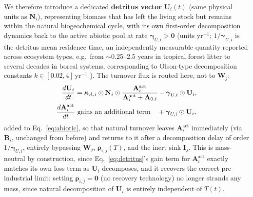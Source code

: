 \documentclass[twocolumn,10pt]{article}
\begin{document}
We therefore introduce a dedicated \textbf{detritus vector} $\mathbf U_i(t)$ (same physical units as $\mathbf N_i$), representing biomass that has left the living stock but remains within the natural biogeochemical cycle, with its own first-order decomposition dynamics back to the active abiotic pool at rate $\boldsymbol\gamma_{U,i}>\mathbf 0$ (units yr$^{-1}$; $1/\boldsymbol\gamma_{U,i}$ is the detritus mean residence time, an independently measurable quantity reported across ecosystem types, e.g.\ from $\sim$0.25--2.5 years in tropical forest litter to several decades in boreal systems, corresponding to Olson-type decomposition constants $k\in[0.02,4]\,\text{yr}^{-1}$ \cite{olson1963}). The turnover flux is routed here, not to $\mathbf W_j$:
\begin{align}
\frac{d\mathbf U_i}{dt} &= \boldsymbol\kappa_{A,i}\odot\mathbf N_i\odot\frac{\mathbf A^{\text{act}}_i}{\mathbf A^{\text{act}}_i+\mathbf A_{0,i}} - \boldsymbol\gamma_{U,i}\odot\mathbf U_i, \label{eq:detritus}\\
\frac{d\mathbf A^{\text{act}}_i}{dt}&\ \text{gains an additional term}\quad+\boldsymbol\gamma_{U,i}\odot\mathbf U_i,\notag
\end{align}
added to Eq.~\eqref{eq:abiotic}, so that natural turnover leaves $\mathbf A^{\text{act}}_i$ immediately (via $\mathbf B_i$, unchanged from before) and returns to it after a decomposition delay of order $1/\boldsymbol\gamma_{U,i}$, entirely bypassing $\mathbf W_j$, $\boldsymbol\rho_{i,j}(T)$, and the inert sink $\mathbf I_j$. This is mass-neutral by construction, since Eq.~\eqref{eq:detritus}'s gain term for $\mathbf A^{\text{act}}_i$ exactly matches its own loss term as $\mathbf U_i$ decomposes, and it recovers the correct pre-industrial limit: setting $\boldsymbol\rho_{i,j}=\mathbf 0$ (no recovery technology) no longer strands any mass, since natural decomposition of $\mathbf U_i$ is entirely independent of $T(t)$.
\end{document}
